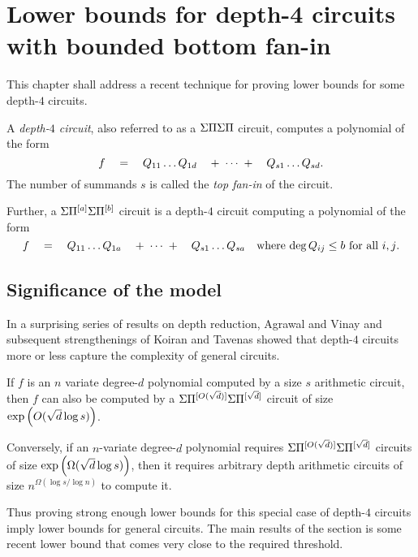 \chapter{Lower bounds for depth-4 circuits with bounded bottom fan-in}

This chapter shall address a recent technique for proving lower bounds for some depth-$4$ circuits. 

\begin{definition}
  A \emph{depth-$4$ circuit}, also referred to as a $\Sigma\Pi\Sigma\Pi$ circuit, computes a polynomial of the form 
  $$
  f \quad = \quad Q_{11}\dots Q_{1d} \quad +\;\cdots\;+ \quad  Q_{s1}\dots Q_{sd}.
  $$
  The number of summands $s$ is called the \emph{top fan-in} of the circuit. 

  Further, a $\Sigma\Pi^{[a]}\Sigma\Pi^{[b]}$ circuit is a depth-$4$ circuit computing a polynomial of the form
  $$
  f \quad = \quad Q_{11}\dots Q_{1a} \quad +\;\cdots\;+ \quad  Q_{s1}\dots Q_{sa}\quad\text{where $\deg Q_{ij} \leq b$ for all $i,j$}.
  $$
\end{definition}

\section{Significance of the model}

In a surprising series of results on depth reduction, Agrawal and Vinay \cite{av08} and subsequent strengthenings of Koiran \cite{koiran} and Tavenas \cite{Tav13} showed that depth-$4$ circuits more or less capture the complexity of general circuits. 

\begin{theorem} 
  If $f$ is an $n$ variate degree-$d$ polynomial computed by a size $s$ arithmetic circuit, then $f$ can also be computed by a $\Sigma\Pi^{[O(\sqrt{d})]}\Sigma\Pi^{[\sqrt{d}]}$ circuit of size $\exp\left(O(\sqrt{d}\log s)\right)$. 
  
  Conversely, if an $n$-variate degree-$d$ polynomial requires $\Sigma\Pi^{[O(\sqrt{d})]}\Sigma\Pi^{[\sqrt{d}]}$  circuits of size $\exp\left(\Omega(\sqrt{d}\log s)\right)$, then it requires arbitrary depth arithmetic circuits of size $n^{\Omega(\log s / \log n)}$ to compute it. 
\end{theorem}

Thus proving strong enough lower bounds for this special case of depth-$4$ circuits imply lower bounds for general circuits. 
The main results of the section is some recent lower bound \cite{gkks13,KSS13,FLMS13} that comes very close to the required threshold. 

